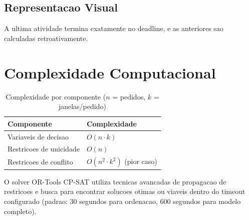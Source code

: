\documentclass[12pt,a4paper]{article}
\begin{document}
\subsection{Representacao Visual}

\begin{center}
\end{center}

A ultima atividade termina exatamente no deadline, e as anteriores sao calculadas retroativamente.

\section{Complexidade Computacional}

\begin{table}[h]
\centering
\begin{tabular}{ll}
\toprule
\textbf{Componente} & \textbf{Complexidade} \\
\midrule
Variaveis de decisao & $O(n \cdot k)$ \\
Restricoes de unicidade & $O(n)$ \\
Restricoes de conflito & $O(n^2 \cdot k^2)$ (pior caso) \\
\bottomrule
\end{tabular}
\caption{Complexidade por componente ($n$ = pedidos, $k$ = janelas/pedido)}
\end{table}

O solver OR-Tools CP-SAT utiliza tecnicas avancadas de propagacao de restricoes e busca para encontrar solucoes otimas ou viaveis dentro do timeout configurado (padrao: 30 segundos para ordenacao, 600 segundos para modelo completo).
\end{document}
